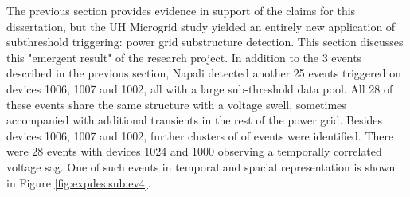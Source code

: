 The previous section provides evidence in support of the claims for this dissertation, but the UH Microgrid study yielded an entirely new application of subthreshold triggering: power grid substructure detection.
This section discusses this "emergent result" of the research project.
In addition to the 3 events described in the previous section, Napali detected another 25 events triggered on devices 1006, 1007 and 1002, all with a large sub-threshold data pool.
All 28 of these events share the same structure with a voltage swell, sometimes accompanied with additional transients in the rest of the power grid.
Besides devices 1006, 1007 and 1002, further clusters of of events were identified.
There were 28 events with devices 1024 and 1000 observing a temporally correlated voltage sag.
One of such events in temporal and spacial representation is shown in Figure \ref{fig:expdes:sub:ev4}.

